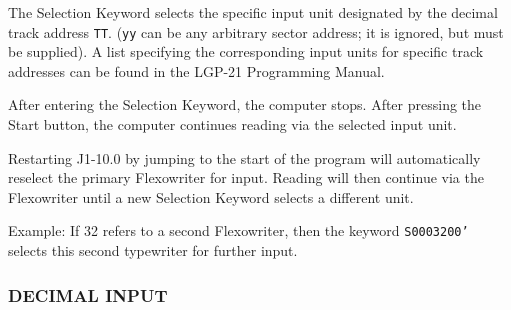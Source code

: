 \begin{itemize}
The Selection Keyword selects the specific input unit designated by the decimal track address \texttt{TT}. (\texttt{yy} can be any arbitrary sector address; it is ignored, but must be supplied). A list specifying the corresponding input units for specific track addresses can be found in the LGP-21 Programming Manual.


After entering the Selection Keyword, the computer stops. After pressing the Start button, the computer continues reading via the selected input unit. 

Restarting J1-10.0 by jumping to the start of the program will automatically reselect the primary Flexowriter for input. Reading will then continue via the Flexowriter until a new Selection Keyword selects a different unit.

Example: If 32 refers to a second Flexowriter, then the keyword \texttt{S0003200'} selects this second typewriter for further input.

\end{itemize}
\subsubsection*{DECIMAL INPUT}

